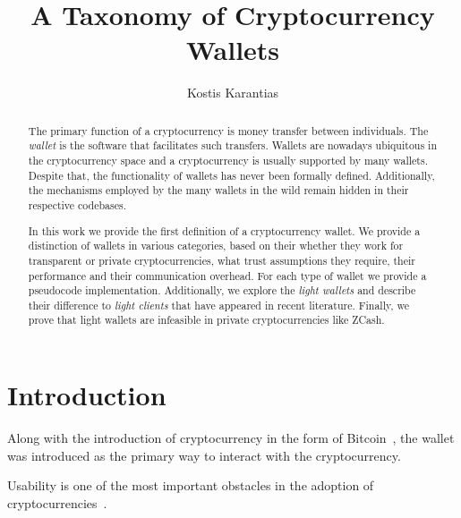 \documentclass[sigconf]{acmart}
\begin{document}
\title{A Taxonomy of Cryptocurrency Wallets}

\author{Kostis Karantias}

\renewcommand{\shortauthors}{Karantias}

\begin{abstract}
    The primary function of a cryptocurrency is money transfer between individuals. The \emph{wallet} is the software that facilitates such transfers. Wallets are nowadays ubiquitous in the cryptocurrency space and a cryptocurrency is usually supported by many wallets. Despite that, the functionality of wallets has never been formally defined. Additionally, the mechanisms employed by the many wallets in the wild remain hidden in their respective codebases.
    
    In this work we provide the first definition of a cryptocurrency wallet. We provide a distinction of wallets in various categories, based on their whether they work for transparent or private cryptocurrencies, what trust assumptions they require, their performance and their communication overhead. For each type of wallet we provide a pseudocode implementation. Additionally, we explore the \emph{light wallets} and describe their difference to \emph{light clients} that have appeared in recent literature. Finally, we prove that light wallets are infeasible in private cryptocurrencies like ZCash.
\end{abstract}

\maketitle

\section{Introduction}
Along with the introduction of cryptocurrency in the form of Bitcoin~\cite{bitcoin}, the wallet was introduced as the primary way to interact with the cryptocurrency.

Usability is one of the most important obstacles in the adoption of cryptocurrencies~\cite{meiklejohn2018top}.
\end{document}
